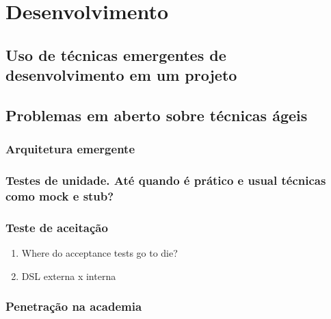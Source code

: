 \chapter{Desenvolvimento}

\section{Uso de técnicas emergentes de desenvolvimento em um projeto}

\section{Problemas em aberto sobre técnicas ágeis}

\subsection{Arquitetura emergente}

\subsection{Testes de unidade. Até quando é prático e usual técnicas como mock e stub?}

\subsection{Teste de aceitação}
\begin{enumerate}
\item Where do acceptance tests go to die?
\item DSL externa x interna
\end{enumerate}

\subsection{Penetração na academia}

